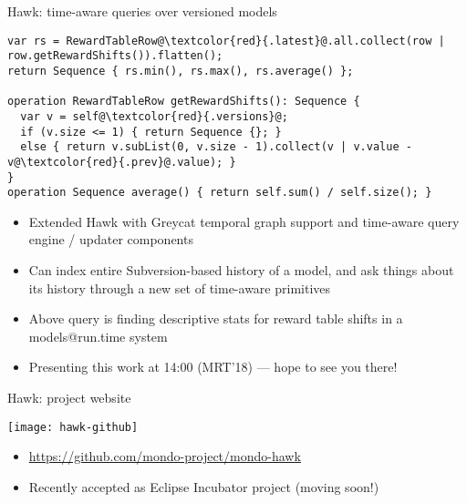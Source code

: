 \begin{frame}[fragile]{Hawk: time-aware queries over versioned models~\cite{hawk-mrt2018}}

  \begin{lstlisting}[frame=tb,language=EOL,escapechar=@,basicstyle=\footnotesize]
var rs = RewardTableRow@\textcolor{red}{.latest}@.all.collect(row | row.getRewardShifts()).flatten();
return Sequence { rs.min(), rs.max(), rs.average() };

operation RewardTableRow getRewardShifts(): Sequence {
  var v = self@\textcolor{red}{.versions}@;
  if (v.size <= 1) { return Sequence {}; }
  else { return v.subList(0, v.size - 1).collect(v | v.value - v@\textcolor{red}{.prev}@.value); }
}
operation Sequence average() { return self.sum() / self.size(); }
  \end{lstlisting}

  \begin{itemize}
  \item Extended Hawk with Greycat temporal graph support and time-aware query
    engine / updater components
  \item Can index entire Subversion-based history of a model, and ask things
    about its history through a new set of time-aware primitives
  \item Above query is finding descriptive stats for reward table shifts in a
    models@run.time system
  \item \alert{Presenting this work at 14:00 (MRT'18) --- hope to see you there!}
  \end{itemize}

\end{frame}

\begin{frame}{Hawk: project website}
  \begin{center}
    \texttt{[image: hawk-github]}
  \end{center}

  \begin{itemize}
  \item \url{https://github.com/mondo-project/mondo-hawk}
  \item Recently accepted as Eclipse Incubator project (moving soon!)
  \end{itemize}
\end{frame}


